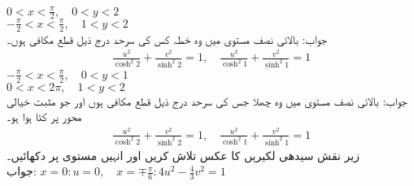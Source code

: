 \quad
$0<x<\tfrac{\pi}{2},\quad 0<y<2$\\
\quad
$-\tfrac{\pi}{2}<x<\tfrac{\pi}{2},\quad 1<y<2$\\
جواب:\quad
بالائی نصف مستوی میں وہ خطہ کس کی سرحد درج ذیل قطع مکافی ہوں۔
\begin{align*}
\frac{u^2}{\cosh^2 2}+\frac{v^2}{\sinh^2 2}=1, \quad \frac{u^2}{\cosh^2 1}+\frac{v^2}{\sinh^2 1}=1
\end{align*}
\quad
$-\tfrac{\pi}{2}<x<\tfrac{\pi}{2},\quad 0<y<1$\\
\quad
$0<x<2\pi,\quad 1<y<2$\\
جواب:\quad
بالائی نصف مستوی میں وہ چھلا جس کی سرحد درج ذیل قطع مکافی ہوں اور جو مثبت خیالی محور پر کٹا ہوا ہو۔
\begin{align*}
\frac{u^2}{\cosh^2 2}+\frac{v^2}{\sinh^2 2}=1, \quad \frac{u^2}{\cosh^2 1}+\frac{v^2}{\sinh^2 1}=1
\end{align*}
\quad
زیر نقش  سیدھی لکیریں  کا عکس تلاش کریں اور انہیں  مستوی پر دکھائیں۔\\
جواب:\quad
$x=0: u=0,\quad x=\mp \tfrac{\pi}{6}: 4u^2-\tfrac{4}{3}v^2=1$

